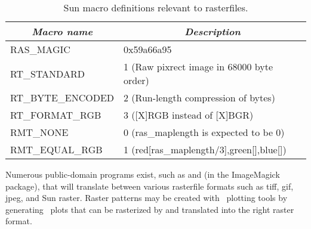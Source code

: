 \begin{table}[H]
\centering
\begin{tabular}{|l|l|}	\hline

\multicolumn{1}{|c}{\emph{Macro name}}	&	\multicolumn{1}{|c|}{\emph{Description}}	\\ \hline
RAS\_MAGIC	&	0x59a66a95  \\ \hline
RT\_STANDARD	&	1 (Raw pixrect image in 68000 byte order)  \\ \hline
RT\_BYTE\_ENCODED	&	2 (Run-length compression of bytes)  \\ \hline
RT\_FORMAT\_RGB	&	3 ([X]RGB instead of [X]BGR)  \\ \hline
RMT\_NONE	&	0 (ras\_maplength is expected to be 0)  \\ \hline
RMT\_EQUAL\_RGB	&	1 (red[ras\_maplength/3],green[],blue[])  \\ \hline

\end{tabular}

\caption{Sun macro definitions relevant to rasterfiles.}
\label{tbl:sundef}
\end{table} 

Numerous public-domain programs exist, such as  and
 (in the ImageMagick package), that will translate
between various rasterfile formats such as tiff, gif, jpeg, and
Sun raster.  Raster patterns may be created with \GMT\ plotting
tools by generating \PS\ plots that can be rasterized
by  and translated into the right raster format.
